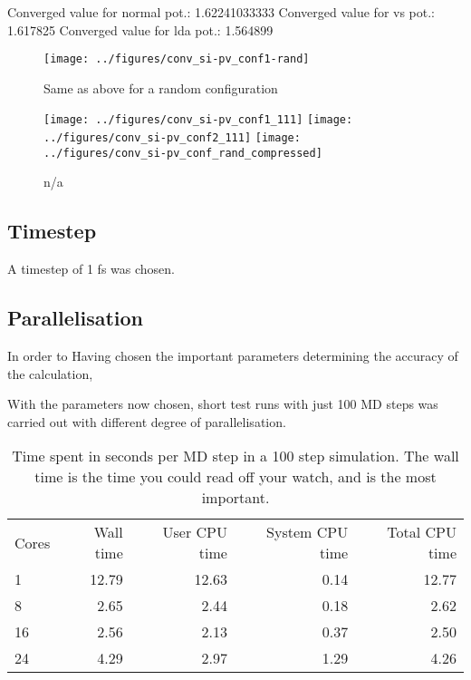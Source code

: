 \documentclass[11pt]{scrbook}   %
\begin{document}
Converged value for normal pot.: 1.62241033333
Converged value for vs pot.: 1.617825
Converged value for lda pot.: 1.564899


\begin{figure}[htbp]
  \begin{center}
    \texttt{[image: ../figures/conv\_si-pv\_conf1-rand]}
  \end{center}
  \caption{Same as above for a random configuration}
  \label{fig:figs/conv_si-pv_conf1-rand}
\end{figure}


\begin{figure}[htbp]
  \begin{center}
    \texttt{[image: ../figures/conv\_si-pv\_conf1\_111]}
    \texttt{[image: ../figures/conv\_si-pv\_conf2\_111]}
    \texttt{[image: ../figures/conv\_si-pv\_conf\_rand\_compressed]}
  \end{center}
  \caption{n/a}
  \label{fig:figs/conv_si-pv_conf}
\end{figure}




\subsection{Timestep}

A timestep of 1 fs was chosen.

\cite{Richie:2004}


\subsection{Parallelisation}

In order to 
Having chosen the important parameters determining the accuracy of the calculation, 

With the parameters now chosen, short test runs with just 100 MD steps was carried out with different degree of parallelisation.


\begin{table}[htbp]
  \centering
  \begin{tabular}{lrrrr}
    Cores & Wall time & User CPU time & System CPU time & Total CPU time \\
    1     & 12.79 & 12.63 & 0.14 & 12.77 \\
    8     & 2.65 & 2.44 & 0.18 & 2.62 \\
    16    & 2.56 & 2.13 & 0.37 & 2.50 \\
    24    & 4.29 & 2.97 & 1.29 & 4.26 \\
  \end{tabular}
  \caption{Time spent in seconds per MD step in a 100 step simulation. The wall time is the time you could read off your watch, and is the most important.}
  \label{tab:}
\end{table}
\end{document}
